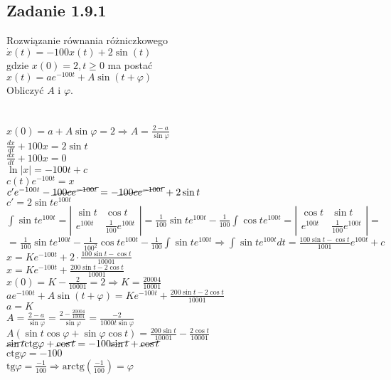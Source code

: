 \subsection*{Zadanie 1.9.1} {\color{darkgray}
	Rozwiązanie równania różniczkowego\\
	$\dot{x}(t)=-100x(t)+2\sin(t)$\\
	gdzie $x(0)=2, t\geqslant 0$ ma postać\\
	$x(t)=ae^{-100t}+A\sin(t+\varphi)$\\
	Obliczyć $A$ i $\varphi$.\\
}\lineh
\\\\
$x(0)=a+A\sin \varphi =2 \Rightarrow \boxed{A=\frac{2-a}{\sin \varphi}}$\\
$\frac{dx}{dt}+100x=2\sin t$\\
$\frac{dx}{dt}+100x=0$\\
$\ln|x|=-100t+c$\\
$c(t)e^{-100t}=x$\\
$c'e^{-100t}-\cancel{100ce^{-100t}}=-\cancel{100ce^{-100t}}+2\sin t$\\
$c'=2\sin t e^{100t}$\\
$\int \sin t e^{100t}=\left|\begin{array}{cc}\sin t & \cos t \\ e^{100t} & \frac{1}{100}e^{100t}\end{array}\right|=\frac{1}{100}\sin t e^{100t}-\frac{1}{100} \int \cos t e^{100t}=\left|\begin{array}{cc}\cos t & \sin t \\ e^{100t} & \frac{1}{100}e^{100t}\end{array}\right|=$\\
$=\frac{1}{100}\sin t e^{100t}-\frac{1}{100^2}\cos t e^{100t}-\frac{1}{100} \int \sin t e^{100t} \Rightarrow \int \sin t e^{100t} dt = \boxed{\frac{100\sin t - \cos t}{1001}e^{100t}+c}$\\
$\boxed{x=Ke^{-100t}+2\cdot\frac{100\sin t - \cos t}{10001}}$\\
$x=Ke^{-100t}+\frac{200\sin t -2\cos t}{10001}$\\
$x(0)=K-\frac{2}{10001}=2 \Rightarrow K=\frac{20004}{10001}$\\
$ae^{-100t}+A\sin(t+\varphi)=Ke^{-100t}+\frac{200\sin t - 2 \cos t}{10001}$\\
$a=K$\\
$A=\frac{2-a}{\sin \varphi}=\frac{2-\frac{20004}{10001}}{\sin \varphi}=\frac{-2}{1000t\sin\varphi}$\\
$A(\sin t \cos \varphi + \sin \varphi \cos t)=\frac{200\sin t}{10001}-\frac{2\cos t}{10001}$\\
$\cancel{\sin t}\text{ctg}\varphi+\cancel{\cos t}=-100\cancel{\sin t}+\cancel{\cos t}$\\
$\text{ctg}\varphi= -100$\\
$\text{tg}\varphi=\frac{-1}{100} \Rightarrow \boxed{\text{arctg}(\frac{-1}{100})=\varphi}$\\


